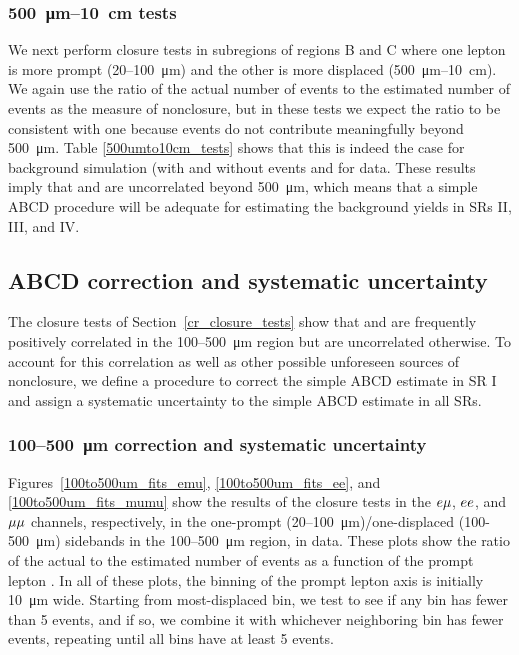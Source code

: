 \subsubsection{\SI{500}{\um}--\SI{10}{\cm} tests}
We next perform closure tests in subregions of regions B and C where one lepton is more prompt (\num{20}--\SI{100}{\um}) and the other is more displaced (\SI{500}{\um}--\SI{10}{\cm}). We again use the ratio of the actual number of events to the estimated number of events as the measure of nonclosure, but in these tests we expect the ratio to be consistent with one because \ztautaull events do not contribute meaningfully beyond \SI{500}{\um}. Table \ref{500umto10cm_tests} shows that this is indeed the case for background simulation (with and without \ztautaull events and for data. These results imply that \ada and \adb are uncorrelated beyond \SI{500}{\um}, which means that a simple ABCD procedure will be adequate for estimating the background yields in SRs II, III, and IV.



\subsection{ABCD correction and systematic uncertainty}
\label{abcd_correction}
The closure tests of Section~\ref{cr_closure_tests} show that \ada and \adb are frequently positively correlated in the \num{100}--\SI{500}{\um} region but are uncorrelated otherwise. To account for this correlation as well as other possible unforeseen sources of nonclosure, we define a procedure to correct the simple ABCD estimate in SR I and assign a systematic uncertainty to the simple ABCD estimate in all SRs.

\subsubsection{\num{100}--\SI{500}{\um} correction and systematic uncertainty}
Figures~\ref{100to500um_fits_emu}, \ref{100to500um_fits_ee}, and \ref{100to500um_fits_mumu} show the results of the closure tests in the $e{\mu}$, $ee$, and ${\mu}{\mu}$ channels, respectively, in the one-prompt (\num{20}--\SI{100}{\um})/one-displaced (\num{100}-\SI{500}{\um}) sidebands in the \num{100}--\SI{500}{\um} region, in data. These plots show the ratio of the actual to the estimated number of events as a function of the prompt lepton \ad. In all of these plots, the binning of the prompt lepton axis is initially \SI{10}{\um} wide. Starting from most-displaced bin, we test to see if any bin has fewer than 5 events, and if so, we combine it with whichever neighboring bin has fewer events, repeating until all bins have at least 5 events.


